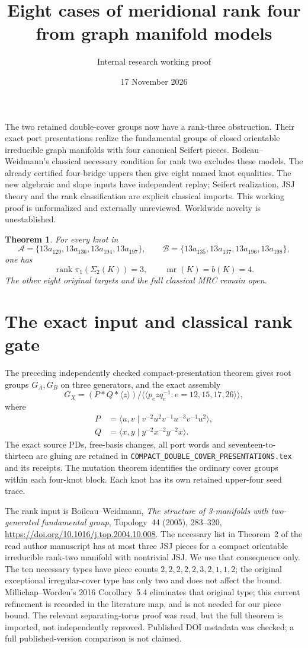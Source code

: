 \documentclass[11pt]{article}
\title{Eight cases of meridional rank four from graph manifold models}
\author{Internal research working proof}
\date{17 November 2026}
\newtheorem{theorem}{Theorem}
\newcommand{\rank}{\operatorname{rank}}
\newcommand{\mr}{\operatorname{mr}}
\begin{document}
\maketitle

The two retained double-cover groups now have a rank-three obstruction.
Their exact port presentations realize the fundamental groups of closed
orientable irreducible graph manifolds with four canonical Seifert pieces.
Boileau--Weidmann's classical necessary condition for rank two excludes
these models. The already certified four-bridge uppers then give eight
named knot equalities. The new algebraic and slope inputs have independent
replay; Seifert realization, JSJ theory and the rank classification are
explicit classical imports. This working proof is unformalized and
externally unreviewed. Worldwide novelty is unestablished.

\begin{theorem}\label{thm:knots}
For every knot in
\[
\mathcal A=\{13a_{129},13a_{136},13a_{194},13a_{197}\},\qquad
\mathcal B=\{13a_{135},13a_{137},13a_{196},13a_{198}\},
\]
one has
\[
 \rank\pi_1(\Sigma_2(K))=3,\qquad \mr(K)=b(K)=4.
\]
The other eight original targets and the full classical MRC remain open.
\end{theorem}

\section{The exact input and classical rank gate}

The preceding independently checked compact-presentation theorem gives
root groups $G_A,G_B$ on three generators, and the exact assembly
\[
 G_X=(P*Q*\langle z\rangle)/
 \langle\!\langle p_ezq_e^{-1}:e=12,15,17,26\rangle\!\rangle,
\]
where
\begin{align*}
P&=\langle u,v\mid v^{-2}u^2v^{-1}u^{-3}v^{-1}u^2\rangle,\\
Q&=\langle x,y\mid y^{-2}x^{-2}y^{-2}x\rangle.
\end{align*}
The exact source PDs, free-basis changes, all port words and
seventeen-to-thirteen arc gluing are retained in
\texttt{COMPACT\_DOUBLE\_COVER\_PRESENTATIONS.tex} and its receipts.
The mutation theorem identifies the ordinary cover groups within each
four-knot block. Each knot has its own retained upper-four seed trace.

The rank input is Boileau--Weidmann, \emph{The structure of 3-manifolds
with two-generated fundamental group}, Topology~44 (2005), 283--320,
\url{https://doi.org/10.1016/j.top.2004.10.008}. The necessary list in
Theorem~2 of the read author manuscript has at most three JSJ pieces
for a compact orientable irreducible rank-two manifold with nontrivial
JSJ. We use that consequence only. The ten necessary types have piece
counts $2,2,2,2,2,3,2,1,1,2$; the original exceptional irregular-cover
type has only two and does not affect the bound. Millichap--Worden's
2016 Corollary~5.4 eliminates that original type; this current refinement
is recorded in the literature map, and is not needed for our piece bound.
The relevant
separating-torus proof was read, but the full theorem is imported,
not independently reproved. Published DOI metadata was checked;
a full published-version comparison is not claimed.
\end{document}
